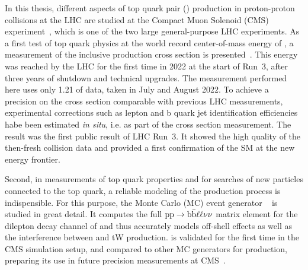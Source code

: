 In this thesis, different aspects of top quark pair (\ttbar) production in proton-proton collisions at the LHC are studied at the Compact Muon Solenoid (CMS) experiment~\cite{CMS:2008xjf}, which is one of the two large general-purpose LHC experiments. 
As a first test of top quark physics at the world record center-of-mass energy of \sqrtsRIII, a measurement of the inclusive \ttbar production cross section is presented~\cite{CMS:TOP-22-012}.
This energy was reached by the LHC for the first time in 2022 at the start of Run~3, after three years of shutdown and technical upgrades. The measurement performed here uses only \SI{1.21}{\fbinv} of data, taken in July and August 2022. To achieve a precision on the \ttbar cross section comparable with previous LHC measurements, experimental corrections such as lepton and b quark jet identification efficiencies habe been estimated \textit{in situ}, i.e. as part of the cross section measurement. The result was the first public result of LHC Run~3. It showed the high quality of the then-fresh collision data and provided a first confirmation of the SM at the new energy frontier.


Second, in measurements of top quark properties and for searches of new particles connected to the top quark, a reliable modeling of the \ttbar production process is indispensible.
For this purpose, the Monte Carlo (MC) event generator \bbfourl~\cite{Jezo:2016ujg} is studied in great detail. It computes the full $\mathrm{p p} \rightarrow \mathrm{b \bar{b}} \ell \ell \nu \nu$ matrix element for the dilepton decay channel of \ttbar and thus accurately models off-shell effects as well as the interference between \ttbar and tW production.
\bbfourl is validated for the first time in the CMS simulation setup, and compared to other MC generators for \ttbar production, preparing its use in future precision measurements at CMS~\cite{CMS:NOTE-2023-015}.

